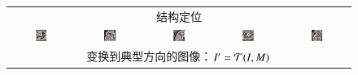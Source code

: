 \begin{figure}
\begin{center}
\begin{tabular}{ccccc}
\multicolumn{5}{c}{结构定位} \\

\includegraphics[width=0.19\textwidth]{./data/ohm/control/HCMNet_1100594/00_SAX/35_/im_det.png} &
\includegraphics[width=0.19\textwidth]{./data/ohm/control/HCMNet_1100823/00_SAX/33_/im_det.png} &
\includegraphics[width=0.19\textwidth]{./data/ohm/control/HCMNet_2600035/00_SAX/024_SA_CINE/im_det.png} &
\includegraphics[width=0.19\textwidth]{./data/ohm/control/HCMNet_1700012/01_HLA/00/im_det.png} &
\includegraphics[width=0.19\textwidth]{./data/ohm/control/HCMNet_2100096/02_VLA/00/im_det.png} \\

\multicolumn{5}{c}{变换到典型方向的图像：$I^\prime = \mathcal{T}(I,M)$} \\


\end{tabular}
\end{center}
\end{figure}
